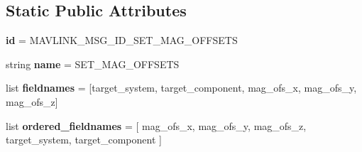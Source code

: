 \subsection*{Static Public Attributes}
\begin{DoxyCompactItemize}
\item 
\mbox{\label{classpymavlink_1_1dialects_1_1v10_1_1MAVLink__set__mag__offsets__message_a0bb397d1c5a8de868f0854ca851740e5}} 
{\bfseries id} = M\+A\+V\+L\+I\+N\+K\+\_\+\+M\+S\+G\+\_\+\+I\+D\+\_\+\+S\+E\+T\+\_\+\+M\+A\+G\+\_\+\+O\+F\+F\+S\+E\+TS
\item 
\mbox{\label{classpymavlink_1_1dialects_1_1v10_1_1MAVLink__set__mag__offsets__message_a2d8b16c18a900f45f3ef2a0afcde2b8c}} 
string {\bfseries name} = \textquotesingle{}S\+E\+T\+\_\+\+M\+A\+G\+\_\+\+O\+F\+F\+S\+E\+TS\textquotesingle{}
\item 
\mbox{\label{classpymavlink_1_1dialects_1_1v10_1_1MAVLink__set__mag__offsets__message_a05ba571f3c2bf54a22a6bafc1f68cfe8}} 
list {\bfseries fieldnames} = \mbox{[}\textquotesingle{}target\+\_\+system\textquotesingle{}, \textquotesingle{}target\+\_\+component\textquotesingle{}, \textquotesingle{}mag\+\_\+ofs\+\_\+x\textquotesingle{}, \textquotesingle{}mag\+\_\+ofs\+\_\+y\textquotesingle{}, \textquotesingle{}mag\+\_\+ofs\+\_\+z\textquotesingle{}\mbox{]}
\item 
\mbox{\label{classpymavlink_1_1dialects_1_1v10_1_1MAVLink__set__mag__offsets__message_aa4a30e944c0b7c9bad192432cb704dce}} 
list {\bfseries ordered\+\_\+fieldnames} = \mbox{[} \textquotesingle{}mag\+\_\+ofs\+\_\+x\textquotesingle{}, \textquotesingle{}mag\+\_\+ofs\+\_\+y\textquotesingle{}, \textquotesingle{}mag\+\_\+ofs\+\_\+z\textquotesingle{}, \textquotesingle{}target\+\_\+system\textquotesingle{}, \textquotesingle{}target\+\_\+component\textquotesingle{} \mbox{]}
\item 
\mbox{\label{classpymavlink_1_1dialects_1_1v10_1_1MAVLink__set__mag__offsets__message_acd90f45565e4124ff858ee3020b8ff16}} 

\end{DoxyCompactItemize}
